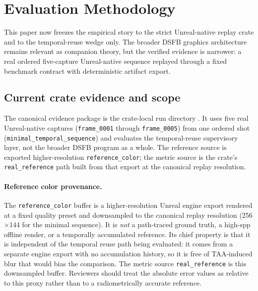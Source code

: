 \documentclass[11pt,letterpaper]{article}
\theoremstyle{gcresult}
\theoremstyle{definition}
\begin{document}

\section{Evaluation Methodology}
\label{sec:evaluation}

This paper now freezes the empirical story to the strict Unreal-native replay crate and to the temporal-reuse wedge only. The broader DSFB graphics architecture remains relevant as companion theory, but the verified evidence is narrower: a real ordered five-capture Unreal-native sequence replayed through a fixed benchmark contract with deterministic artifact export.

\subsection{Current crate evidence and scope}

The canonical evidence package is the crate-local run directory . It uses five real Unreal-native captures (\texttt{frame\_0001} through \texttt{frame\_0005}) from one ordered shot (\texttt{minimal\_temporal\_sequence}) and evaluates the temporal-reuse supervisory layer, not the broader DSFB program as a whole. The reference source is exported higher-resolution \texttt{reference\_color}; the metric source is the crate's \texttt{real\_reference} path built from that export at the canonical replay resolution.

\paragraph{Reference color provenance.}
The \texttt{reference\_color} buffer is a higher-resolution Unreal engine export rendered at a fixed quality preset and downsampled to the canonical replay resolution (256$\times$144 for the minimal sequence). It is \emph{not} a path-traced ground truth, a high-spp offline render, or a temporally accumulated reference. Its chief property is that it is independent of the temporal reuse path being evaluated: it comes from a separate engine export with no accumulation history, so it is free of TAA-induced blur that would bias the comparison. The metric source \texttt{real\_reference} is this downsampled buffer. Reviewers should treat the absolute error values as relative to this proxy rather than to a radiometrically accurate reference.
\end{document}
